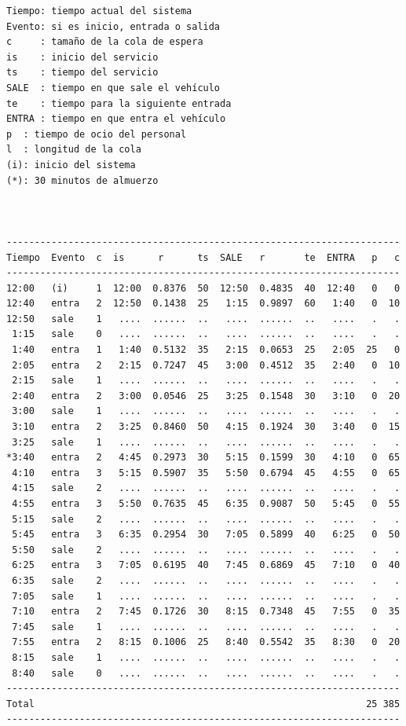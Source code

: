 \begin{verbatim}
Tiempo: tiempo actual del sistema
Evento: si es inicio, entrada o salida
c     : tamaño de la cola de espera
is    : inicio del servicio
ts    : tiempo del servicio
SALE  : tiempo en que sale el vehículo
te    : tiempo para la siguiente entrada
ENTRA : tiempo en que entra el vehículo
p  : tiempo de ocio del personal
l  : longitud de la cola
(i): inicio del sistema
(*): 30 minutos de almuerzo



----------------------------------------------------------------------
Tiempo  Evento  c  is      r      ts  SALE   r       te  ENTRA   p   c
----------------------------------------------------------------------
12:00   (i)     1  12:00  0.8376  50  12:50  0.4835  40  12:40   0   0
12:40   entra   2  12:50  0.1438  25   1:15  0.9897  60   1:40   0  10
12:50   sale    1   ....  ......  ..   ....  ......  ..   ....   .   .
 1:15   sale    0   ....  ......  ..   ....  ......  ..   ....   .   .
 1:40   entra   1   1:40  0.5132  35   2:15  0.0653  25   2:05  25   0
 2:05   entra   2   2:15  0.7247  45   3:00  0.4512  35   2:40   0  10
 2:15   sale    1   ....  ......  ..   ....  ......  ..   ....   .   .
 2:40   entra   2   3:00  0.0546  25   3:25  0.1548  30   3:10   0  20
 3:00   sale    1   ....  ......  ..   ....  ......  ..   ....   .   .
 3:10   entra   2   3:25  0.8460  50   4:15  0.1924  30   3:40   0  15
 3:25   sale    1   ....  ......  ..   ....  ......  ..   ....   .   .
*3:40   entra   2   4:45  0.2973  30   5:15  0.1599  30   4:10   0  65
 4:10   entra   3   5:15  0.5907  35   5:50  0.6794  45   4:55   0  65
 4:15   sale    2   ....  ......  ..   ....  ......  ..   ....   .   .
 4:55   entra   3   5:50  0.7635  45   6:35  0.9087  50   5:45   0  55
 5:15   sale    2   ....  ......  ..   ....  ......  ..   ....   .   .
 5:45   entra   3   6:35  0.2954  30   7:05  0.5899  40   6:25   0  50
 5:50   sale    2   ....  ......  ..   ....  ......  ..   ....   .   .
 6:25   entra   3   7:05  0.6195  40   7:45  0.6869  45   7:10   0  40
 6:35   sale    2   ....  ......  ..   ....  ......  ..   ....   .   .
 7:05   sale    1   ....  ......  ..   ....  ......  ..   ....   .   .
 7:10   entra   2   7:45  0.1726  30   8:15  0.7348  45   7:55   0  35
 7:45   sale    1   ....  ......  ..   ....  ......  ..   ....   .   .
 7:55   entra   2   8:15  0.1006  25   8:40  0.5542  35   8:30   0  20
 8:15   sale    1   ....  ......  ..   ....  ......  ..   ....   .   .
 8:40   sale    0   ....  ......  ..   ....  ......  ..   ....   .   .
----------------------------------------------------------------------
Total                                                           25 385
----------------------------------------------------------------------





\end{verbatim}
